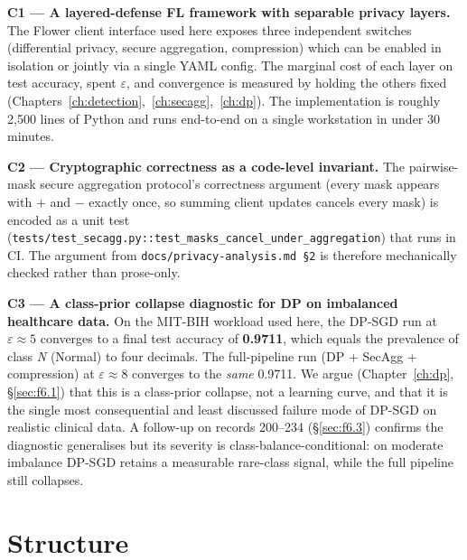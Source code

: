 \documentclass[11pt,a4paper]{report}
\begin{document}
\textbf{C1 --- A layered-defense FL framework with separable privacy layers.}
The Flower client interface used here exposes three independent switches
(differential privacy, secure aggregation, compression) which can be enabled in
isolation or jointly via a single YAML config. The marginal cost of each layer
on test accuracy, spent $\varepsilon$, and convergence is measured by holding
the others fixed (Chapters~\ref{ch:detection},~\ref{ch:secagg},~\ref{ch:dp}).
The implementation is roughly 2{,}500 lines of Python and runs end-to-end on a
single workstation in under 30 minutes.

\textbf{C2 --- Cryptographic correctness as a code-level invariant.}
The pairwise-mask secure aggregation protocol's correctness argument
(every mask appears with $+$ and $-$ exactly once, so summing client updates
cancels every mask) is encoded as a unit test
(\texttt{tests/test\_secagg.py::test\_masks\_cancel\_under\_aggregation}) that
runs in CI. The argument from
\texttt{docs/privacy-analysis.md~\S2}
\cite{bonawitz2017secagg} is therefore mechanically checked rather than
prose-only.

\textbf{C3 --- A class-prior collapse diagnostic for DP on imbalanced
healthcare data.} On the MIT-BIH workload used here, the DP-SGD run at
$\varepsilon \approx 5$ converges to a final test accuracy of
\textbf{0.9711}, which equals the prevalence of class \emph{N} (Normal) to four
decimals. The full-pipeline run (DP + SecAgg + compression) at
$\varepsilon \approx 8$ converges to the \emph{same} 0.9711. We argue
(Chapter~\ref{ch:dp}, \S\ref{sec:f6.1}) that this is a class-prior collapse,
not a learning curve, and that it is the single most consequential and least
discussed failure mode of DP-SGD on realistic clinical data. A follow-up on
records 200--234 (\S\ref{sec:f6.3}) confirms the diagnostic generalises but
its severity is class-balance-conditional: on moderate imbalance DP-SGD
retains a measurable rare-class signal, while the full pipeline still
collapses.

\section{Structure}
\end{document}
